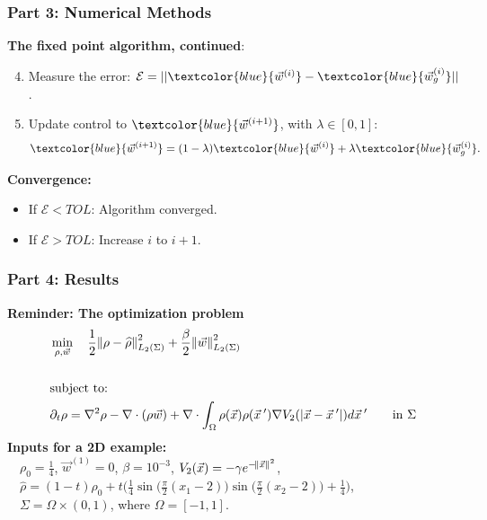 \documentclass[aspectratio=169,xcolor=dvipsnames]{beamer}
\begin{document}
\begin{frame}
	\frametitle{Part 3: Numerical Methods}
	\textbf{The fixed point algorithm, continued}:\\
    \vspace{0.3cm}
   \begin{enumerate}
   	\setcounter{enumi}{3}
   	\item Measure the error: $\mathcal{E} = ||\textcolor{blue}{\vec{w}^{(i)}} - \textcolor{blue}{\vec{w}^{(i)}_g}||$.
   	\item Update control to $\textcolor{blue}{\vec{w}^{(i+1)}}$, with $\lambda \in [0,1]$:
   	\begin{align*}
   	\textcolor{blue}{\vec{w}^{(i+1)}} = (1-\lambda)\textcolor{blue}{\vec{w}^{(i)}} + \lambda \textcolor{blue}{\vec{w}^{(i)}_g}.
   	\end{align*}
   \end{enumerate}
\vspace{0.5cm}
\textbf{Convergence:}\\
\begin{itemize}
\item If $\mathcal{E} <TOL$: Algorithm converged.
\item If $\mathcal{E} >TOL$: Increase $i$ to $i+1$.
\end{itemize}

\end{frame}
\begin{frame}
	\frametitle{Part 4: Results}

	\textbf{Reminder: The optimization problem}
	\begin{align*}
	&\min_{\rho,\vec{w}} \quad \frac{1}{2}\norm{\rho- \widehat{\rho}}_{L_2(\Sigma)}^2 + \frac{\beta}{2} \norm{\vec{w}}_{L_2(\Sigma)}^2\\
	\\
	&\text{subject to:}
	\\
	& \partial_t \rho = \nabla^2 \rho - \nabla \cdot (\rho \vec{w})+{\nabla \cdot \int_\Omega \rho(\vec{x}) \rho(\vec{x}\hspace{0.2em}') \nabla V_2(|\vec{x}-\vec{x}\hspace{0.2em}'|)d\vec{x}\hspace{0.2em}'} \qquad \text{in    } \Sigma
	\end{align*}
    \textbf{Inputs for a 2D example:}\\
    \vspace{0.2 cm}
    	$ \quad\rho_0 = \frac{1}{4}$, $\vec{w}^{(1)} = 0$, $\beta = 10^{-3}$, $V_2(\vec{x}) = -\gamma e^{-{\norm{\vec{x}}}^2}$,\\
	    $\quad\widehat \rho = (1-t)\rho_0 + t\bigg(\frac{1}{4}\sin \bigg(\frac{\pi}{2}(x_1 - 2)\bigg)\sin \bigg(\frac{\pi}{2}(x_2 - 2)\bigg) + \frac{1}{4}\bigg)$,\\	
	    $\quad \Sigma = \Omega \times (0,1)$, where $\Omega = [-1,1]$.
\end{frame}
\end{document}

